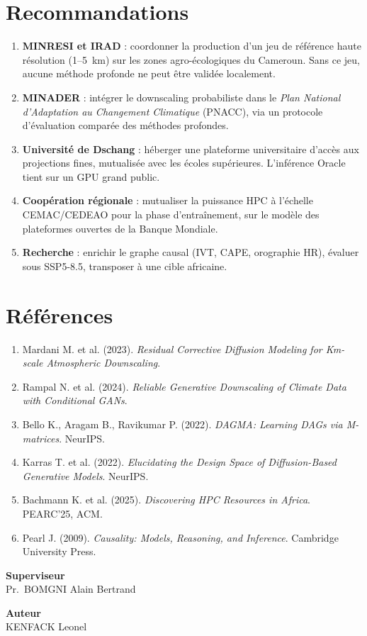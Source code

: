 \documentclass[14pt,a4paper]{extarticle}
\begin{document}
\section*{Recommandations}
\begin{enumerate}
    \item \textbf{MINRESI et IRAD} : coordonner la production d'un jeu de référence haute résolution (1--5~km) sur les zones agro-écologiques du Cameroun. Sans ce jeu, aucune méthode profonde ne peut être validée localement.
    \item \textbf{MINADER} : intégrer le downscaling probabiliste dans le \emph{Plan National d'Adaptation au Changement Climatique} (PNACC), via un protocole d'évaluation comparée des méthodes profondes.
    \item \textbf{Université de Dschang} : héberger une plateforme universitaire d'accès aux projections fines, mutualisée avec les écoles supérieures. L'inférence Oracle tient sur un GPU grand public.
    \item \textbf{Coopération régionale} : mutualiser la puissance HPC à l'échelle CEMAC/CEDEAO pour la phase d'entraînement, sur le modèle des plateformes ouvertes de la Banque Mondiale.
    \item \textbf{Recherche} : enrichir le graphe causal (IVT, CAPE, orographie HR), évaluer sous SSP5-8.5, transposer à une cible africaine.
\end{enumerate}

\section*{Références}
\begin{enumerate}
    \item Mardani M. et al. (2023). \emph{Residual Corrective Diffusion Modeling for Km-scale Atmospheric Downscaling}.
    \item Rampal N. et al. (2024). \emph{Reliable Generative Downscaling of Climate Data with Conditional GANs}.
    \item Bello K., Aragam B., Ravikumar P. (2022). \emph{DAGMA: Learning DAGs via M-matrices}. NeurIPS.
    \item Karras T. et al. (2022). \emph{Elucidating the Design Space of Diffusion-Based Generative Models}. NeurIPS.
    \item Bachmann K. et al. (2025). \emph{Discovering HPC Resources in Africa}. PEARC'25, ACM.
    \item Pearl J. (2009). \emph{Causality: Models, Reasoning, and Inference}. Cambridge University Press.
\end{enumerate}

\vspace{3em}

\noindent
\begin{minipage}[t]{0.48\linewidth}
\centering
\textbf{Superviseur}\\[2.5em]
Pr.~BOMGNI Alain Bertrand
\end{minipage}\hfill
\begin{minipage}[t]{0.48\linewidth}
\centering
\textbf{Auteur}\\[2.5em]
KENFACK Leonel
\end{minipage}
\end{document}
